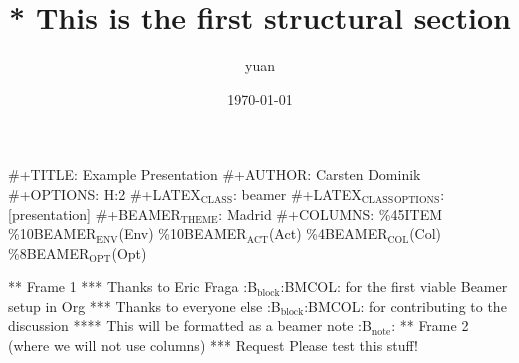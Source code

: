 \documentclass[11pt]{article}
\begin{document}
\begin{CJK*}{UTF8}{gbsn}



\title{* This is the first structural section}
\author{yuan}
\date{\today}
\maketitle

\setcounter{tocdepth}{3}
\tableofcontents
\vspace*{1cm}
 \#+TITLE: Example Presentation
 \#+AUTHOR: Carsten Dominik
 \#+OPTIONS: H:2
 \#+LATEX$_{\mathrm{CLASS}}$: beamer
 \#+LATEX$_{\mathrm{CLASS}}$$_{\mathrm{OPTIONS}}$: [presentation]
 \#+BEAMER$_{\mathrm{THEME}}$: Madrid
 \#+COLUMNS: \%45ITEM \%10BEAMER$_{\mathrm{ENV}}$(Env) \%10BEAMER$_{\mathrm{ACT}}$(Act) \%4BEAMER$_{\mathrm{COL}}$(Col) \%8BEAMER$_{\mathrm{OPT}}$(Opt)
 
       
 ** Frame 1
 *** Thanks to Eric Fraga                                           :B$_{\mathrm{block}}$:BMCOL:
 for the first viable Beamer setup in Org
 *** Thanks to everyone else                                        :B$_{\mathrm{block}}$:BMCOL:
 for contributing to the discussion
 **** This will be formatted as a beamer note                              :B$_{\mathrm{note}}$:
 ** Frame 2 (where we will not use columns)
 *** Request
 Please test this stuff!

\end{CJK*}
\end{document}
